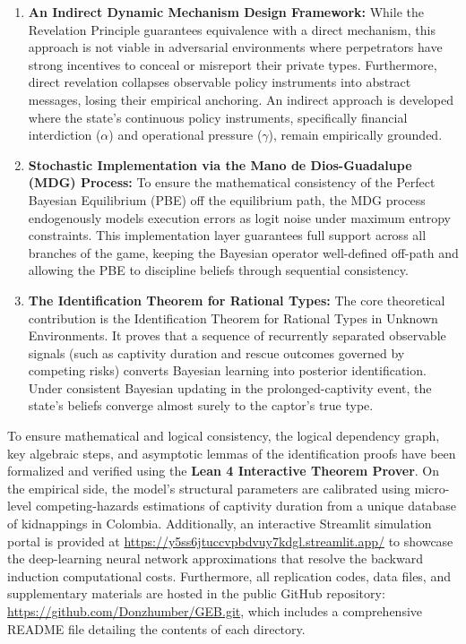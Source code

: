 \documentclass[12pt]{article}
\begin{document}
\begin{enumerate}
    \item \textbf{An Indirect Dynamic Mechanism Design Framework:} While the Revelation Principle guarantees equivalence with a direct mechanism, this approach is not viable in adversarial environments where perpetrators have strong incentives to conceal or misreport their private types. Furthermore, direct revelation collapses observable policy instruments into abstract messages, losing their empirical anchoring. An indirect approach is developed where the state's continuous policy instruments, specifically financial interdiction ($\alpha$) and operational pressure ($\gamma$), remain empirically grounded.
    
    \item \textbf{Stochastic Implementation via the Mano de Dios-Guadalupe (MDG) Process:} To ensure the mathematical consistency of the Perfect Bayesian Equilibrium (PBE) off the equilibrium path, the MDG process endogenously models execution errors as logit noise under maximum entropy constraints. This implementation layer guarantees full support across all branches of the game, keeping the Bayesian operator well-defined off-path and allowing the PBE to discipline beliefs through sequential consistency.
    
    \item \textbf{The Identification Theorem for Rational Types:} The core theoretical contribution is the Identification Theorem for Rational Types in Unknown Environments. It proves that a sequence of recurrently separated observable signals (such as captivity duration and rescue outcomes governed by competing risks) converts Bayesian learning into posterior identification. Under consistent Bayesian updating in the prolonged-captivity event, the state's beliefs converge almost surely to the captor's true type.
\end{enumerate}

To ensure mathematical and logical consistency, the logical dependency graph, key algebraic steps, and asymptotic lemmas of the identification proofs have been formalized and verified using the \textbf{Lean 4 Interactive Theorem Prover}. On the empirical side, the model's structural parameters are calibrated using micro-level competing-hazards estimations of captivity duration from a unique database of kidnappings in Colombia. Additionally, an interactive Streamlit simulation portal is provided at \url{https://y5ss6jtuccvpbdvuy7kdgl.streamlit.app/} to showcase the deep-learning neural network approximations that resolve the backward induction computational costs. Furthermore, all replication codes, data files, and supplementary materials are hosted in the public GitHub repository: \url{https://github.com/Donzhumber/GEB.git}, which includes a comprehensive README file detailing the contents of each directory.
\end{document}
